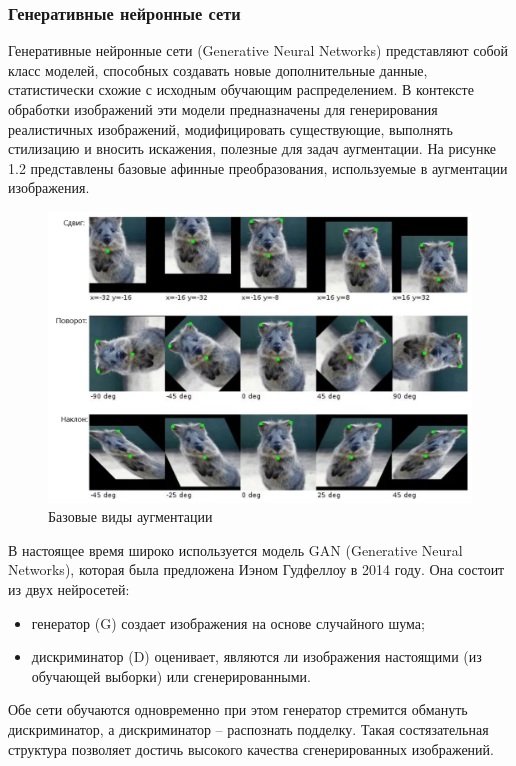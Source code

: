 \subsubsection{Генеративные нейронные сети}

Генеративные нейронные сети (Generative Neural Networks) представляют собой класс моделей, способных создавать новые дополнительные данные, статистически схожие с исходным обучающим распределением. В контексте обработки изображений эти модели предназначены для генерирования реалистичных изображений, модифицировать существующие, выполнять стилизацию и вносить искажения, полезные для задач аугментации. На рисунке 1.2 представлены базовые афинные преобразования, используемые в аугментации изображения.

\begin{figure}[H]
	\centering
	\includegraphics[width=1\linewidth]{images/augexample}
	\caption{Базовые виды аугментации}
	\label{fig:augexample}
\end{figure}


В настоящее время широко используется модель GAN (Generative Neural Networks), которая была предложена Иэном Гудфеллоу в 2014 году. Она состоит из двух нейросетей:

\begin{itemize}
	\item генератор (G) создает изображения на основе случайного шума;
	\item дискриминатор (D) оценивает, являются ли изображения настоящими (из обучающей выборки) или сгенерированными.
\end{itemize}

Обе сети обучаются одновременно при этом генератор стремится обмануть дискриминатор, а дискриминатор – распознать подделку. Такая состязательная структура позволяет достичь высокого качества сгенерированных изображений.


